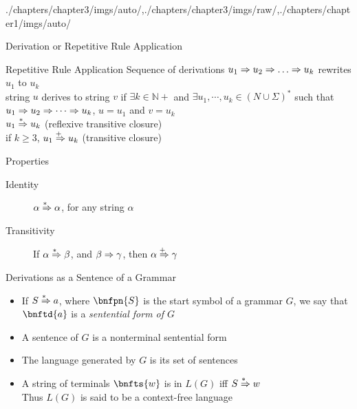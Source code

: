 \begin{graphicspathcontext}{{./chapters/chapter3/imgs/auto/},{./chapters/chapter3/imgs/raw/},{./chapters/chapter1/imgs/auto/}}
\begin{bibunit}[apalike]
\begin{frame}{Derivation or Repetitive Rule Application}
	\begin{definitionblock}{Repetitive Rule Application}
		Sequence of derivations $u_1 \deriv u_2 \deriv \dots \deriv u_k$ rewrites $u_1$ to $u_k$ \\[.2cm]
		 string $u$ derives to string $v$ if $\exists k\in\mathbb{N}+$ and $\exists u_{1},\cdots ,u_{k}\in (N\cup \Sigma)^{*}$ such that $u_{1}\Rightarrow u_{2}\Rightarrow \cdots \Rightarrow u_{k}$, $u=u_1$ and $v=u_k$ \\[.2cm]
		 $u_1 \overset{*\hspace{.4em}}{\Rightarrow} u_k$ (reflexive transitive closure)\\
		 if $k\ge3$, $u_1 \overset{+\hspace{.4em}}{\Rightarrow} u_k$ (transitive closure)
	\end{definitionblock}
	\begin{block}{Properties}
		\begin{description}
		\item[Identity] $\alpha\overset{*\hspace{.4em}}{\Rightarrow}\alpha$, for any string $\alpha$
		\item[Transitivity] If $\alpha\overset{*\hspace{.4em}}{\Rightarrow}\beta$, and $\beta\Rightarrow\gamma$, then $\alpha\overset{+\hspace{.4em}}{\Rightarrow}\gamma$
		\end{description}
	\end{block}
\end{frame}

\begin{frame}[background=8]{Derivations as a Sentence of a Grammar}
	\begin{itemize}
	\item If $S \overset{*\hspace{.4em}}{\Rightarrow} a$, where $\bnfpn{S}$ is the start symbol of a grammar $G$, we say that $\bnftd{a}$ is a \emph{sentential form of $G$}
	\vfill
	\item A sentence of $G$ is a nonterminal sentential form
	\vfill
	\item The language generated by $G$ is its set of sentences
	\vfill
	\item A string of terminals $\bnfts{w}$ is in $L(G)$ iff $S \overset{*\hspace{.4em}}{\Rightarrow} w$ \\
		Thus $L(G)$ is said to be a context-free language
	\end{itemize}
\end{frame}


\end{bibunit}
\end{graphicspathcontext}
